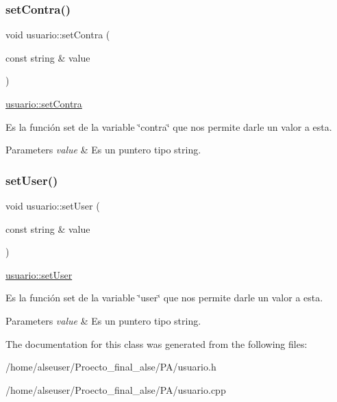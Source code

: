\subsubsection{\texorpdfstring{set\+Contra()}{setContra()}}
{\footnotesize\ttfamily void usuario\+::set\+Contra (\begin{DoxyParamCaption}\item[{const string \&}]{value }\end{DoxyParamCaption})}



\hyperlink{classusuario_a8e027d694579ff05152cc77c50886111}{usuario\+::set\+Contra} 

Es la función set de la variable \char`\"{}contra\char`\"{} que nos permite darle un valor a esta. 
\begin{DoxyParams}{Parameters}
{\em value} & Es un puntero tipo string. \\
\hline
\end{DoxyParams}
\mbox{\label{classusuario_a0dc83a4f7544e487109854604f167e94}} 
\subsubsection{\texorpdfstring{set\+User()}{setUser()}}
{\footnotesize\ttfamily void usuario\+::set\+User (\begin{DoxyParamCaption}\item[{const string \&}]{value }\end{DoxyParamCaption})}



\hyperlink{classusuario_a0dc83a4f7544e487109854604f167e94}{usuario\+::set\+User} 

Es la función set de la variable \char`\"{}user\char`\"{} que nos permite darle un valor a esta. 
\begin{DoxyParams}{Parameters}
{\em value} & Es un puntero tipo string. \\
\hline
\end{DoxyParams}


The documentation for this class was generated from the following files\+:\begin{DoxyCompactItemize}
\item 
/home/alseuser/\+Proecto\+\_\+final\+\_\+alse/\+P\+A/usuario.\+h\item 
/home/alseuser/\+Proecto\+\_\+final\+\_\+alse/\+P\+A/usuario.\+cpp\end{DoxyCompactItemize}
